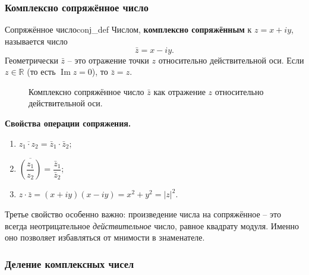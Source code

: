 \documentclass[12pt,a4paper]{article}
\begin{document}
\subsubsection*{Комплексно сопряжённое число}

\begin{definition}{Сопряжённое число}{conj_def}
  Числом, \textbf{комплексно сопряжённым} к $z = x + iy$, называется
  число
  \[
    \bar{z} = x - iy.
  \]
  Геометрически $\bar{z}$ -- это отражение точки $z$ относительно
  действительной оси. Если $z \in \mathbb{R}$ (то есть
  $\operatorname{Im} z = 0$), то $\bar{z} = z$.
\end{definition}

\begin{figure}[h!]
  \centering
  \caption{Комплексно сопряжённое число $\bar{z}$ как отражение $z$
  относительно действительной оси.}
  \label{fig:conj}
\end{figure}

\noindent\textbf{Свойства операции сопряжения.}
\begin{enumerate}
  \item $\overline{z_1 \cdot z_2} = \bar{z}_1 \cdot \bar{z}_2$;
  \item $\overline{\left(\dfrac{z_1}{z_2}\right)}
    = \dfrac{\bar{z}_1}{\bar{z}_2}$;
  \item $z \cdot \bar{z} = (x + iy)(x - iy) = x^2 + y^2 = |z|^2$.
\end{enumerate}

Третье свойство особенно важно: произведение числа на сопряжённое --
это всегда неотрицательное \emph{действительное} число, равное квадрату
модуля. Именно оно позволяет избавляться от мнимости в знаменателе.

\subsubsection*{Деление комплексных чисел}
\end{document}
